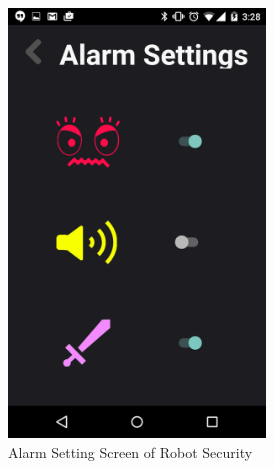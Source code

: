 \documentclass[12pt]{article}
\begin{document}
\begin{figure}[!htbp]
\begin{subfigure}[b]{0.45\textwidth}
    \includegraphics[width=0.75\textwidth]{settings.png}
    \caption{Alarm Setting Screen of Robot Security}
    \label{settings}
    \end{subfigure}\\~\\
    \centering
    \begin{subfigure}[b]{0.45\textwidth}
    \centering

\end{subfigure}
\end{figure}
\end{document}
